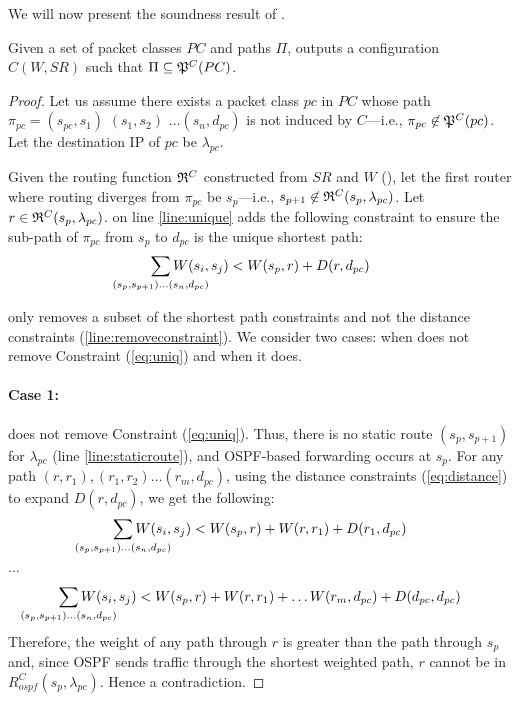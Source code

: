 
We will now present the soundness result of . 
\begin{theorem}[Soundness]
	Given a set of packet classes $PC$ and paths $\Pi$,  outputs
	a configuration $C(W,SR)$ such that $\Pi\subseteq\mathfrak{P}^C(PC)$.
\end{theorem}
\begin{proof}
Let us assume there exists a packet class $pc$ in $PC$ whose path $\pi_{pc} =
(s_{pc}, s_1)$ $ (s_1, s_2)$ 
$\ldots (s_n, d_{pc})$ is not induced by $C$---i.e.,
$\pi_{pc} \not\in \mathfrak{P}^C(pc)$. Let the destination IP of $pc$ be
$\lambda_{pc}$.

Given the routing function $\mathfrak{R}^C$ constructed from $SR$ and
$W$ (), let the first router where routing diverges from $\pi_{pc}$ be $s_p$---i.e.,  
$s_{p+1} \not\in \mathfrak{R}^C(s_{p}, \lambda_{pc})$. Let  $r \in \mathfrak{R}^C(s_{p}, \lambda_{pc})$.  
 on line \ref{line:unique} adds the following
constraint to ensure the sub-path of $\pi_{pc}$ 
from $s_{p}$ to $d_{pc}$ is the unique shortest path: 
\begin{equation} \label{eq:uniq}
\sum_{\mathclap{\substack{(s_{p},s_{p+1})\ldots(s_{n},d_{pc})}}} 
W(s_i, s_j) < W(s_{p}, r) + D(r, d_{pc})
\end{equation}

only removes a subset of the shortest path 
constraints and 
not the distance constraints (\ref{line:removeconstraint}). We consider 
two cases: when 
does not remove Constraint (\ref{eq:uniq}) and when it does. 

\paragraph{Case 1:} 
 does not remove Constraint (\ref{eq:uniq}). 
Thus, there is no static route $(s_p, s_{p+1})$ for
$\lambda_{pc}$ (line \ref{line:staticroute}), and 
OSPF-based forwarding occurs at $s_{p}$. 
For any path $(r, r_1), (r_1, r_2) \ldots (r_m, d_{pc})$, 
using the distance constraints (\ref{eq:distance}) to
expand $D(r, d_{pc})$, we get the following: 
\[
\sum_{\mathclap{\substack{(s_{p},s_{p+1})\ldots(s_{n},d_{pc})}}} 
W(s_i, s_j) < W(s_{p}, r) + W(r, r_{1}) + D(r_{1}, d_{pc})
\]
\begin{center}
	$\ldots$
\end{center}
\[
\sum_{\mathclap{\substack{(s_{p},s_{p+1})\ldots(s_{n},d_{pc})}}} 
W(s_i, s_j) < W(s_{p}, r) + W(r, r_{1}) + \ldots W(r_{m}, d_{pc}) + D(d_{pc}, d_{pc})
\]
Therefore, the weight of any path through $r$ is greater than 
the path through $s_{p}$ and, since
OSPF sends traffic through the shortest weighted
path, $r$ cannot be in $R^C_{ospf}(s_p, \lambda_{pc})$.
Hence a contradiction. 


\end{proof}
